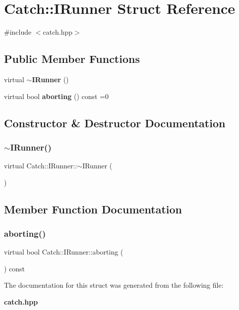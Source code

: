 \section{Catch\+:\+:I\+Runner Struct Reference}
\label{struct_catch_1_1_i_runner}


{\ttfamily \#include $<$catch.\+hpp$>$}

\subsection*{Public Member Functions}
\begin{DoxyCompactItemize}
\item 
virtual \textbf{ $\sim$\+I\+Runner} ()
\item 
virtual bool \textbf{ aborting} () const =0
\end{DoxyCompactItemize}


\subsection{Constructor \& Destructor Documentation}
\mbox{\label{struct_catch_1_1_i_runner_a5f539a88a7772d68de8a2e4028774209}} 
\subsubsection{$\sim$\+I\+Runner()}
{\footnotesize\ttfamily virtual Catch\+::\+I\+Runner\+::$\sim$\+I\+Runner (\begin{DoxyParamCaption}{ }\end{DoxyParamCaption})\hspace{0.3cm}{\ttfamily [virtual]}}



\subsection{Member Function Documentation}
\mbox{\label{struct_catch_1_1_i_runner_a03713202dd2e041e30b8030088ab0116}} 
\subsubsection{aborting()}
{\footnotesize\ttfamily virtual bool Catch\+::\+I\+Runner\+::aborting (\begin{DoxyParamCaption}{ }\end{DoxyParamCaption}) const\hspace{0.3cm}{\ttfamily [pure virtual]}}



The documentation for this struct was generated from the following file\+:\begin{DoxyCompactItemize}
\item 
\textbf{ catch.\+hpp}\end{DoxyCompactItemize}
